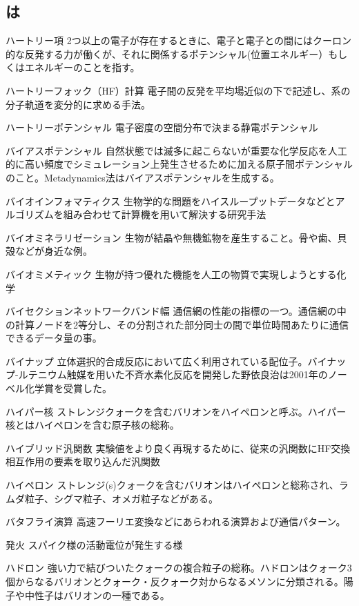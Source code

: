 \begin{用語集}
\section{は}
\item{ハートリー項}{}
{2つ以上の電子が存在するときに、電子と電子との間にはクーロン的な反発する力が働くが、それに関係するポテンシャル(位置エネルギー）もしくはエネルギーのことを指す。}
\item{ハートリーフォック（HF）計算}{}
{電子間の反発を平均場近似の下で記述し、系の分子軌道を変分的に求める手法。}
\item{ハートリーポテンシャル}{}
{電子密度の空間分布で決まる静電ポテンシャル}
\item{バイアスポテンシャル}{}
{自然状態では滅多に起こらないが重要な化学反応を人工的に高い頻度でシミュレーション上発生させるために加える原子間ポテンシャルのこと。Metadynamics法はバイアスポテンシャルを生成する。}
\item{バイオインフォマティクス}{}
{生物学的な問題をハイスループットデータなどとアルゴリズムを組み合わせて計算機を用いて解決する研究手法}
\item{バイオミネラリゼーション}{}
{生物が結晶や無機鉱物を産生すること。骨や歯、貝殻などが身近な例。}
\item{バイオミメティック}{}
{生物が持つ優れた機能を人工の物質で実現しようとする化学}
\item{バイセクションネットワークバンド幅}{}
{通信網の性能の指標の一つ。通信網の中の計算ノードを2等分し、その分割された部分同士の間で単位時間あたりに通信できるデータ量の事。}
\item{バイナップ}{}
{立体選択的合成反応において広く利用されている配位子。バイナップ-ルテニウム触媒を用いた不斉水素化反応を開発した野依良治は2001年のノーベル化学賞を受賞した。}
\item{ハイパー核}{}
{ストレンジクォークを含むバリオンをハイペロンと呼ぶ。ハイパー核とはハイペロンを含む原子核の総称。}
\item{ハイブリッド汎関数}{}
{実験値をより良く再現するために、従来の汎関数にHF交換相互作用の要素を取り込んだ汎関数}
\item{ハイペロン}{}
{ストレンジ(s)クォークを含むバリオンはハイペロンと総称され、ラムダ粒子、シグマ粒子、オメガ粒子などがある。}
\item{バタフライ演算}{}
{高速フーリエ変換などにあらわれる演算および通信パターン。}
\item{発火}{}
{スパイク様の活動電位が発生する様}
\item{ハドロン}{}
{強い力で結びついたクォークの複合粒子の総称。ハドロンはクォーク3個からなるバリオンとクォーク・反クォーク対からなるメソンに分類される。陽子や中性子はバリオンの一種である。}

\end{用語集}

